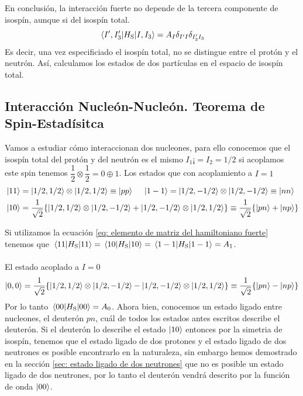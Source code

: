 En conclusión, la interacción fuerte no depende de la tercera componente de isospín, aunque si del isospín total. 
\begin{equation}
    \mel{I^\prime, I_3^\prime}{H_\mathrm{S}}{I,I_3}=A_I\delta_{I^\prime I}\delta_{I_3^\prime I_3}
    \label{eq: elemento de matriz del hamiltoniano fuerte}
\end{equation}
Es decir, una vez especificiado el isospín total, no se distingue entre el protón y el neutrón. Así, calculamos los estados de dos partículas en el espacio de isospín total.

\subsection{Interacción Nucleón-Nucleón. Teorema de Spin-Estadísitca}
Vamos a estudiar cómo interaccionan dos nucleones, para ello conocemos que el isospín total del protón y del neutrón es el mismo $I_1¡=I_2=1/2$ si acoplamos este spin tenemos $\dfrac{1}{2}\otimes \dfrac{1}{2}=0\oplus 1$. Los estados que con acoplamiento a $I=1$
\begin{equation}
\begin{aligned}
    &\ket{11}=\ket{1/2,1/2} \otimes \ket{1/2,1/2} \equiv \ket{pp}\quad \ \ket{1-1}=\ket{1/2,-1/2} \otimes \ket{1/2,-1/2} \equiv \ket{nn}\\
    &\ket{10} =\frac{1}{\sqrt{2}}\qty{\ket{1/2,1/2} \otimes \ket{1/2,-1/2} +\ket{1/2,-1/2} \otimes \ket{1/2,1/2}} \equiv \frac{1}{\sqrt{2}}\qty{\ket{pn}+\ket{np}}
    \label{eq: acoplamientos nucleones isospin 1}
\end{aligned}
\end{equation}

\noindent Si utilizamos la ecuación \ref{eq: elemento de matriz del hamiltoniano fuerte} tenemos que $\mel{11}{H_\mathrm{S}}{11}=\mel{10}{H_\mathrm{S}}{10}=\mel{1-1}{H_\mathrm{S}}{1-1}=A_1$. \\\\
El estado acoplado a $I=0$
\begin{equation}
    \ket{0,0}=\frac{1}{\sqrt{2}}\qty{\ket{1/2,1/2} \otimes \ket{1/2,-1/2} -\ket{1/2,-1/2} \otimes \ket{1/2,1/2}} \equiv \frac{1}{\sqrt{2}}\qty{\ket{pn}-\ket{np}}
    \label{eq: acoplamiento nucleones isospin 0}
\end{equation}
Por lo tanto $\ev{H_\mathrm{S}}{00}=A_0$. Ahora bien, conocemos un estado ligado entre nucleones, el deuterón $pn$, cuál de todos los estados antes escritos describe el deuterón. Si el deuterón lo describe el estado $\ket{10}$ entonces por la simetria de isospín, tenemos que el estado ligado de dos protones y el estado ligado de dos neutrones es posible encontrarlo en la naturaleza, sin embargo hemos demostrado en la sección \ref{sec: estado ligado de dos neutrones} que no es posible un estado ligado de dos neutrones, por lo tanto el deuterón vendrá descrito por la función de onda $\ket{00}$.
